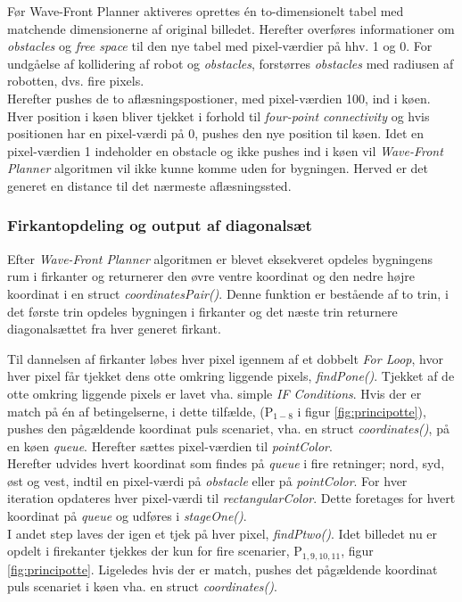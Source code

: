 Før Wave-Front Planner aktiveres oprettes én to-dimensionelt tabel med matchende dimensionerne af original billedet. Herefter overføres informationer om \emph{obstacles} og \emph{free space} til den nye tabel med pixel-værdier på hhv. 1 og 0. For undgåelse af kollidering af robot og \emph{obstacles}, forstørres \emph{obstacles} med radiusen af robotten, dvs. fire pixels.\\
Herefter pushes de to aflæsningspostioner, med pixel-værdien 100, ind i køen. \\

Hver position i køen bliver tjekket i forhold til \emph{four-point connectivity} og hvis positionen har en pixel-værdi på 0, pushes den nye position til køen. Idet en pixel-værdien 1 indeholder en obstacle og ikke pushes ind i køen vil \emph{Wave-Front Planner} algoritmen vil ikke kunne komme uden for bygningen. Herved er det generet en distance til det nærmeste aflæsningssted.

\subsubsection{Firkantopdeling og output af diagonalsæt}
Efter \emph{Wave-Front Planner} algoritmen er blevet eksekveret opdeles bygningens rum i firkanter og returnerer den øvre ventre koordinat og den nedre højre koordinat i en struct \emph{coordinatesPair()}. 
Denne funktion er bestående af to trin, i det første trin opdeles bygningen i firkanter og det næste trin returnere diagonalsættet fra hver generet firkant.

Til dannelsen af firkanter løbes hver pixel igennem af et dobbelt \emph{For Loop}, hvor hver pixel får tjekket dens otte omkring liggende pixels, \emph{findPone()}. 
Tjekket af de otte omkring liggende pixels er lavet vha. simple \emph{IF Conditions}. Hvis der er match på én af betingelserne, i dette tilfælde, (P\(_{1-8}\) i figur \ref{fig:principotte}), pushes den pågældende koordinat puls scenariet, vha. en struct \emph{coordinates()}, på en køen \emph{queue}. Herefter sættes pixel-værdien til \emph{pointColor}.\\
Herefter udvides hvert koordinat som findes på \emph{queue} i fire retninger; nord, syd, øst og vest, indtil en pixel-værdi på \emph{obstacle} eller på \emph{pointColor}. For hver iteration opdateres hver pixel-værdi til \emph{rectangularColor}. Dette foretages for hvert koordinat på \emph{queue} og udføres i \emph{stageOne()}. \\


I andet step laves der igen et tjek på hver pixel, \emph{findPtwo()}. Idet billedet nu er opdelt i firekanter tjekkes der kun for fire scenarier, P\(_{1, 9, 10, 11}\), figur \ref{fig:principotte}. 
Ligeledes hvis der er match, pushes det pågældende koordinat puls scenariet i køen vha. en struct \emph{coordinates()}.\\

